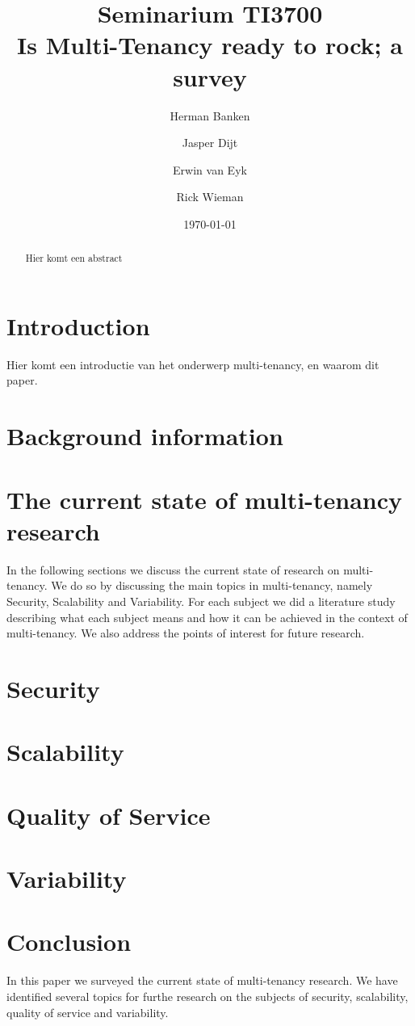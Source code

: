 \documentclass{article}
\title{Seminarium TI3700\\ Is Multi-Tenancy ready to rock; a survey}
\author{Herman Banken\and
    Jasper Dijt\and
    Erwin van Eyk\and
    Rick Wieman}
\date{\today}
\begin{document}
\maketitle
\thispagestyle{empty}

\begin{abstract}
Hier komt een abstract
\end{abstract}


\section{Introduction}
Hier komt een introductie van het onderwerp multi-tenancy, en waarom dit paper.

\section{Background information}


\section{The current state of multi-tenancy research}
In the following sections we discuss the current state of research on multi-tenancy. We do so by discussing the main topics in multi-tenancy, namely Security, Scalability and Variability. For each subject we did a literature study describing what each subject means and how it can be achieved in the context of multi-tenancy. We also address the points of interest for future research.

\section{Security}


\section{Scalability}


\section{Quality of Service}


\section{Variability}



\section{Conclusion}
In this paper we surveyed the current state of multi-tenancy research.
We have identified several topics for furthe research on the subjects of security, scalability, quality of service and variability.




\end{document}
